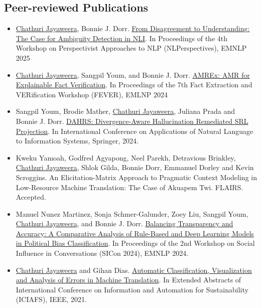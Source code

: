 
\subsection*{Peer-reviewed Publications \hspace{5.5in}}
\begin{itemize}
    \item \underline{Chathuri Jayaweera}, Bonnie J. Dorr. \href{https://aclanthology.org/2025.nlperspectives-1.4/}{From Disagreement to Understanding: The Case for Ambiguity Detection in NLI}. In Proceedings of the 4th Workshop on Perspectivist Approaches to NLP (NLPerspectives), EMNLP 2025
    \item \underline{Chathuri Jayaweera}, Sangpil Youm, and Bonnie J. Dorr. \href{https://aclanthology.org/2024.fever-1.26/}{AMREx: AMR for Explainable Fact Verification}. In Proceedings of the 7th Fact Extraction and VERification Workshop (FEVER), EMLNP 2024
    \item Sangpil Youm, Brodie Mather, \underline{Chathuri Jayaweera}, Juliana Prada and Bonnie J. Dorr. \href{https://link.springer.com/chapter/10.1007/978-3-031-70239-6_29}{DAHRS: Divergence-Aware Hallucination Remediated SRL Projection}. In International Conference on Applications of Natural Language to Information Systems, Springer, 2024.

     \item Kweku Yamoah, Godfred Agyapong, Neel Parekh, Detravious Brinkley, \underline{Chathuri Jayaweera}, Shlok Gilda, Bonnie Dorr, Emmanuel Dorley and Kevin Scroggins. An Elicitation-Matrix Approach to Pragmatic Context Modeling in Low-Resource Machine Translation: The Case of Akuapem Twi. FLAIRS. Accepted.
    
    \item Manuel Nunez Martinez, Sonja Schmer-Galunder, Zoey Liu, Sangpil Youm, \underline{Chathuri Jayaweera}, and Bonnie J. Dorr. \href{https://aclanthology.org/2024.sicon-1.7/}{Balancing Transparency and Accuracy: A Comparative Analysis of Rule-Based and Deep Learning Models in Political Bias Classification}. In Proceedings of the 2nd Workshop on Social Influence in Conversations (SICon 2024), EMNLP 2024.
    \item \underline{Chathuri Jayaweera} and Gihan Dias. \href{http://repo.sltc.ac.lk/handle/456/131}{Automatic Classification, Visualization and Analysis of Errors in Machine Translation}. In Extended Abstracts of International Conference on Information and Automation for Sustainability (ICIAFS), IEEE, 2021.
    

\end{itemize}
